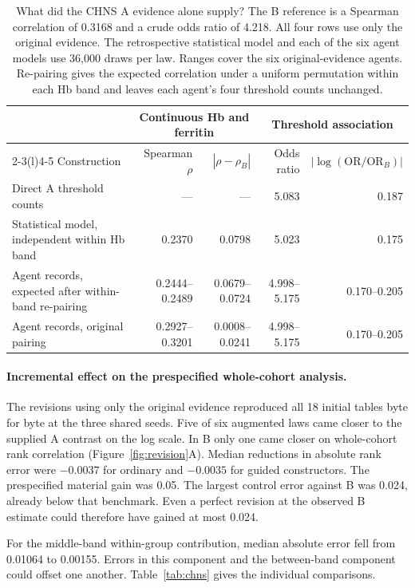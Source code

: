 \begin{table}[t]
\caption{What did the CHNS A evidence alone supply? The B reference is a Spearman correlation of 0.3168 and a crude odds ratio of 4.218. All four rows use only the original evidence. The retrospective statistical model and each of the six agent models use 36,000 draws per law. Ranges cover the six original-evidence agents. Re-pairing gives the expected correlation under a uniform permutation within each Hb band and leaves each agent's four threshold counts unchanged.}
\label{tab:chnsattribution}
\centering
\begin{tabular}{@{}lrrrr@{}}
\toprule
 & \multicolumn{2}{c}{Continuous Hb and ferritin} & \multicolumn{2}{c}{Threshold association}\\
\cmidrule(lr){2-3}\cmidrule(l){4-5}
Construction & Spearman $\rho$ & $|\rho-\rho_B|$ & Odds ratio & $|\log(\mathrm{OR}/\mathrm{OR}_B)|$\\
\midrule
Direct A threshold counts & --- & --- & 5.083 & 0.187\\
Statistical model, independent within Hb band & 0.2370 & 0.0798 & 5.023 & 0.175\\
Agent records, expected after within-band re-pairing & 0.2444--0.2489 & 0.0679--0.0724 & 4.998--5.175 & 0.170--0.205\\
Agent records, original pairing & 0.2927--0.3201 & 0.0008--0.0241 & 4.998--5.175 & 0.170--0.205\\
\bottomrule
\end{tabular}
\end{table}

\paragraph{Incremental effect on the prespecified whole-cohort analysis.}
The revisions using only the original evidence reproduced all 18 initial tables byte for byte at the three shared seeds. Five of six augmented laws came closer to the supplied A contrast on the log scale. In B only one came closer on whole-cohort rank correlation (Figure~\ref{fig:revision}A). Median reductions in absolute rank error were $-0.0037$ for ordinary and $-0.0035$ for guided constructors. The prespecified material gain was 0.05. The largest control error against B was 0.024, already below that benchmark. Even a perfect revision at the observed B estimate could therefore have gained at most 0.024.

For the middle-band within-group contribution, median absolute error fell from 0.01064 to 0.00155. Errors in this component and the between-band component could offset one another. Table~\ref{tab:chns} gives the individual comparisons.

